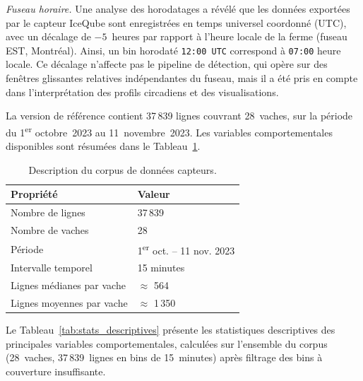 \textit{Fuseau horaire.}
Une analyse des horodatages a révélé que les données exportées par le capteur IceQube sont
enregistrées en temps universel coordonné (UTC), avec un décalage de $-5$~heures par rapport
à l'heure locale de la ferme (fuseau EST, Montréal). Ainsi, un bin horodaté
\texttt{12:00 UTC} correspond à \texttt{07:00} heure locale. Ce décalage n'affecte pas le pipeline de détection, qui opère sur des fenêtres glissantes
relatives indépendantes du fuseau, mais il a été pris en compte dans l'interprétation des
profils circadiens et des visualisations.

La version de référence contient
37\,839 lignes couvrant 28~vaches, sur la période du 1\textsuperscript{er} octobre~2023
au 11~novembre~2023. Les variables comportementales disponibles sont résumées dans le
Tableau~\ref{tab:dataset}.

\begin{table}[H]
    \centering
    \caption{Description du corpus de données capteurs.}
    \label{tab:dataset}
    \begin{tabular}{ll}
        \toprule
        \textbf{Propriété}         & \textbf{Valeur} \\
        \midrule
        Nombre de lignes           & 37\,839 \\
        Nombre de vaches           & 28 \\
        Période                    & 1\textsuperscript{er} oct. -- 11 nov. 2023 \\
        Intervalle temporel        & 15 minutes \\
        Lignes médianes par vache  & $\approx$ 564 \\
        Lignes moyennes par vache  & $\approx$ 1\,350 \\
        \bottomrule
    \end{tabular}
\end{table}

Le Tableau~\ref{tab:stats_descriptives} présente les statistiques descriptives des
principales variables comportementales, calculées sur l'ensemble du corpus
(28~vaches, 37\,839~lignes en bins de 15~minutes) après filtrage des bins à couverture
insuffisante.

